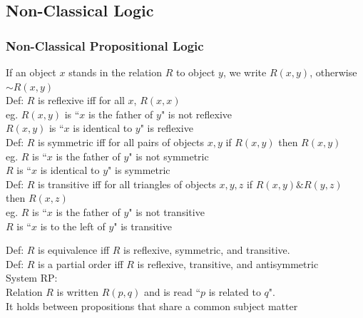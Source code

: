 \subsection{Non-Classical Logic}
\subsubsection{Non-Classical Propositional Logic}

If an object $x$ stands in the relation $R$ to object $y$, we write $R(x,y)$, otherwise $\sim R(x,y)$\\

Def: $R$ is reflexive iff for all $x$, $R(x,x)$\\
eg. $R(x,y)$ is ``$x$ is the father of $y$" is not reflexive\\
$R(x,y)$ is ``$x$ is identical to $y$" is reflexive\\

Def: $R$ is symmetric iff for all pairs of objects $x,y$ if $R(x,y)$ then $R(x,y)$\\
eg. $R$ is ``$x$ is the father of $y$" is not symmetric\\
$R$ is ``$x$ is identical to $y$" is symmetric\\

Def: $R$ is transitive iff for all triangles of objects $x,y,z$ if $R(x,y)\& R(y,z)$ then $R(x,z)$\\
eg. $R$ is ``$x$ is the father of $y$" is not transitive\\
$R$ is ``$x$ is to the left of $y$" is transitive

Def: $R$ is equivalence iff $R$ is reflexive, symmetric, and transitive.\\

Def: $R$ is a partial order iff $R$ is reflexive, transitive, and antisymmetric\\

System RP:\\
Relation $R$ is written $R(p,q)$ and is read ``$p$ is related to $q$".\\
It holds between propositions that share a common subject matter


